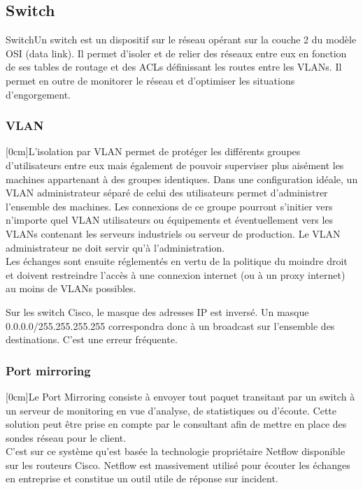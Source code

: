 \documentclass[twoside,a4paper,12pt,titlepage]{book}
\newcommand{\MarginPar}[2]{\marginnote{\scriptsize #1}[#2]}
\begin{document}
\subsection{Switch\label{Switch}}
\begin{Define}{Switch}Un switch est un dispositif sur le réseau opérant sur la couche 2 du modèle OSI (data link). Il permet d'isoler et de relier des réseaux entre eux en fonction de ses tables de routage et des ACLs définissant les routes entre les VLANs. Il permet en outre de monitorer le réseau et d'optimiser les situations d'engorgement.\end{Define}
	\subsubsection{VLAN}
	\MarginPar{\textbf{ACL}}{0cm}L'isolation par \gls{VLAN} permet de protéger les différents groupes d'utilisateurs entre eux mais également de pouvoir superviser plus aisément les machines appartenant à des groupes identiques. Dans une configuration idéale, un VLAN administrateur séparé de celui des utilisateurs permet d'administrer l'ensemble des machines. Les connexions de ce groupe pourront s'initier vers n'importe quel VLAN utilisateurs ou équipements et éventuellement vers les VLANs contenant les serveurs industriels ou serveur de production. Le VLAN administrateur ne doit servir qu'à l'administration.\\
Les échanges sont ensuite réglementés en vertu de la politique du moindre droit et doivent restreindre l'accès à une connexion internet (ou à un proxy internet) au moins de VLANs possibles.
\begin{Warning}Sur les switch Cisco, le masque des adresses IP est inversé. Un masque 0.0.0.0/255.255.255.255 correspondra donc à un broadcast sur l'ensemble des destinations. C'est une erreur fréquente.\end{Warning}
\subsubsection{Port mirroring}
	\MarginPar{\textbf{Monitoring}}{0cm}Le Port Mirroring consiste à envoyer tout paquet transitant par un switch à un serveur de monitoring en vue d'analyse, de statistiques ou d'écoute. Cette solution peut être prise en compte par le consultant afin de mettre en place des sondes réseau pour le client.\\
	C'est sur ce système qu'est basée la technologie propriétaire Netflow disponible sur les routeurs Cisco. Netflow est massivement utilisé pour écouter les échanges en entreprise et constitue un outil utile de réponse sur incident.
\end{document}
